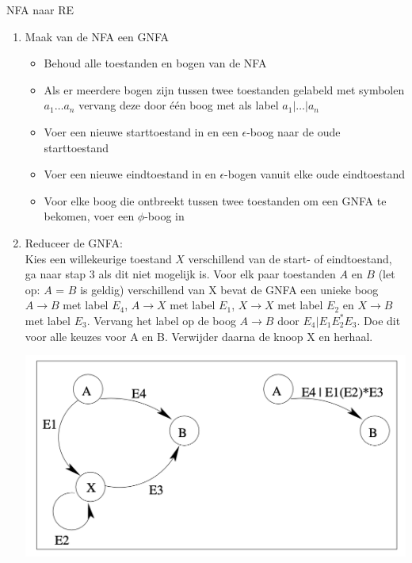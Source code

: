 \begin{alg}[NFA $\to$ RE]{NFA naar RE}
    \begin{enumerate}
        \item Maak van de NFA een GNFA
        \begin{itemize}
            \item Behoud alle toestanden en bogen van de NFA
            \item Als er meerdere bogen zijn tussen twee toestanden gelabeld met symbolen \(a_{1} \ldots a_{n} \) vervang deze door één boog met als label \(a_{1} | \ldots | a_{n} \)
            \item Voer een nieuwe starttoestand in en een \(\epsilon\)-boog naar de oude starttoestand
            \item Voer een nieuwe eindtoestand in en \(\epsilon\)-bogen vanuit elke oude eindtoestand
            \item Voor elke boog die ontbreekt tussen twee toestanden om een GNFA te bekomen, voer een \(\phi\)-boog in
        \end{itemize}
        \item Reduceer de GNFA: \vspace{0.3cm} \\
                Kies een willekeurige toestand \(X\) verschillend van de start- of eindtoestand, ga naar stap 3 als dit niet mogelijk is.
                Voor elk paar toestanden \(A\) en \(B\) (let op: \(A\) = \(B\) is geldig) verschillend van X bevat de GNFA een unieke boog \(A \to B\) met label \(E_{4}\), 
                \(A \to X\) met label \(E_{1}\), \(X \to X\) met label \(E_{2}\) en \(X \to B\) met label \(E_{3}\). Vervang het label op de boog \(A \to B\) door \(E_{4} | E_{1}E_{2}^{*}E_{3}\).
                Doe dit voor alle keuzes voor A en B. Verwijder daarna de knoop X en herhaal.
                \begin{center}
                    \includegraphics[scale = 0.375]{Images/GNFAToestandVerwijderen}

\end{center}
\end{enumerate}
\end{alg}

